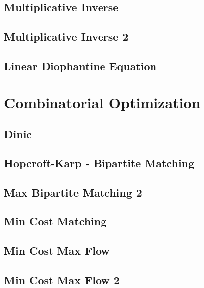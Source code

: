 \subsection{Multiplicative Inverse}
\raggedbottom
\hrulefill
\subsection{Multiplicative Inverse 2}
\raggedbottom
\hrulefill
\subsection{Linear Diophantine Equation}
\raggedbottom
\hrulefill

\section{Combinatorial Optimization}
\subsection{Dinic}
\raggedbottom
\hrulefill
\subsection{Hopcroft-Karp - Bipartite Matching}
\raggedbottom
\hrulefill
\subsection{Max Bipartite Matching 2}
\raggedbottom
\hrulefill
\subsection{Min Cost Matching}
\raggedbottom
\hrulefill
\subsection{Min Cost Max Flow}
\raggedbottom
\hrulefill
\subsection{Min Cost Max Flow 2}
\raggedbottom
\hrulefill
